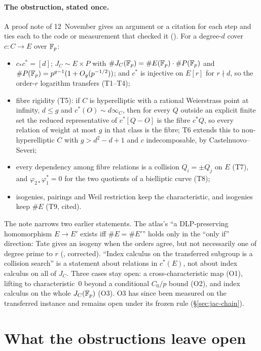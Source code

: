 \paragraph{The obstruction, stated once.} A proof note of 12~November
gives an argument or a citation for each step and ties each to the code or
measurement that checked it
(). For a degree-$d$
cover $c:C\to E$ over $\mathbb{F}_p$:
\begin{itemize}
\item $c_*c^*=[d]$; $J_C\sim E\times P$ with $\#J_C(\mathbb{F}_p)=\#E(\mathbb{F}_p)\cdot\#P(\mathbb{F}_p)$
  and $\#P(\mathbb{F}_p)=p^{g-1}(1+O_g(p^{-1/2}))$; and $c^*$ is injective on $E[r]$
  for $r\nmid d$, so the order-$r$ logarithm transfers (T1--T4);
\item fibre rigidity (T5): if $C$ is hyperelliptic with a rational
  Weierstrass point at infinity, $d\le g$ and $c^*(O)\sim d\infty_C$, then for
  every $Q$ outside an explicit finite set the reduced representative of
  $c^*[Q-O]$ is the fibre $c^*Q$, so every relation of weight at most $g$ in
  that class is the fibre; T6 extends this to non-hyperelliptic $C$ with
  $g>d^2-d+1$ and $c$ indecomposable, by Castelnuovo--Severi;
\item every dependency among fibre relations is a collision $Q_i=\pm Q_j$ on
  $E$ (T7), and $\varphi_{2*}\varphi_1^*=0$ for the two quotients of a
  bielliptic curve (T8);
\item isogenies, pairings and Weil restriction keep the characteristic, and
  isogenies keep $\#E$ (T9, cited).
\end{itemize}
The note narrows two earlier statements. The atlas's ``a DLP-preserving
homomorphism $E\to E'$ exists iff $\#E=\#E'$'' holds only in the ``only if''
direction: Tate gives an isogeny when the orders agree, but not necessarily
one of degree prime to $r$ (,
corrected). ``Index calculus on the transferred subgroup is a collision
search'' is a statement about relations in $c^*(E)$, not about index
calculus on all of $J_C$. Three cases stay open: a cross-characteristic map
(O1), lifting to characteristic~0 beyond a conditional $C_0/p$ bound (O2),
and index calculus on the whole $J_C(\mathbb{F}_p)$ (O3). O3 has since been measured
on the transferred instance and remains open under its frozen rule
(\S\ref{sec:jac-chain}).

\section{What the obstructions leave open}\label{sec:obs-open}

